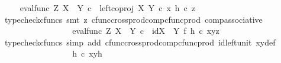\begin{isabellebody}
\ \isamarkupfalse%
\ {\isachardoublequoteopen}{\isachardot}{\kern0pt}{\isachardot}{\kern0pt}{\isachardot}{\kern0pt}\ {\isacharequal}{\kern0pt}\ eval{\isacharunderscore}{\kern0pt}func\ Z\ {\isacharparenleft}{\kern0pt}X\ {\isasymCoprod}\ Y{\isacharparenright}{\kern0pt}\ {\isasymcirc}\isactrlsub c\ \ {\isasymlangle}left{\isacharunderscore}{\kern0pt}coproj\ X\ Y\ {\isasymcirc}\isactrlsub c\ x{\isacharcomma}{\kern0pt}\ h\ {\isasymcirc}\isactrlsub c\ z{\isasymrangle}{\isachardoublequoteclose}\isanewline
\ \ \ \ \ \ \ \ \ \ \ \ \ \ \isamarkupfalse%
\ {\isacharparenleft}{\kern0pt}typecheck{\isacharunderscore}{\kern0pt}cfuncs{\isacharcomma}{\kern0pt}\ smt\ {\isacharparenleft}{\kern0pt}z{}{\isacharparenright}{\kern0pt}\ cfunc{\isacharunderscore}{\kern0pt}cross{\isacharunderscore}{\kern0pt}prod{\isacharunderscore}{\kern0pt}comp{\isacharunderscore}{\kern0pt}cfunc{\isacharunderscore}{\kern0pt}prod\ comp{\isacharunderscore}{\kern0pt}associative{}{\isacharparenright}{\kern0pt}\isanewline
\ \ \ \ \ \ \ \ \ \ \ \ \isamarkupfalse%
\ \isamarkupfalse%
\ {\isachardoublequoteopen}{\isachardot}{\kern0pt}{\isachardot}{\kern0pt}{\isachardot}{\kern0pt}\ {\isacharequal}{\kern0pt}\ eval{\isacharunderscore}{\kern0pt}func\ Z\ {\isacharparenleft}{\kern0pt}X\ {\isasymCoprod}\ Y{\isacharparenright}{\kern0pt}\ {\isasymcirc}\isactrlsub c\ \ {\isacharparenleft}{\kern0pt}{\isacharparenleft}{\kern0pt}id{\isacharparenleft}{\kern0pt}X\ {\isasymCoprod}\ Y{\isacharparenright}{\kern0pt}\ {\isasymtimes}\isactrlsub f\ h{\isacharparenright}{\kern0pt}\ {\isasymcirc}\isactrlsub c\ {\isasymlangle}xy{\isacharcomma}{\kern0pt}z{\isasymrangle}{\isacharparenright}{\kern0pt}{\isachardoublequoteclose}\isanewline
\ \ \ \ \ \ \ \ \ \ \ \ \ \ \isamarkupfalse%
\ {\isacharparenleft}{\kern0pt}typecheck{\isacharunderscore}{\kern0pt}cfuncs{\isacharcomma}{\kern0pt}\ simp\ add{\isacharcolon}{\kern0pt}\ cfunc{\isacharunderscore}{\kern0pt}cross{\isacharunderscore}{\kern0pt}prod{\isacharunderscore}{\kern0pt}comp{\isacharunderscore}{\kern0pt}cfunc{\isacharunderscore}{\kern0pt}prod\ id{\isacharunderscore}{\kern0pt}left{\isacharunderscore}{\kern0pt}unit{}\ xy{\isacharunderscore}{\kern0pt}def{\isacharparenright}{\kern0pt}\isanewline
\ \ \ \ \ \ \ \ \ \ \ \ \isamarkupfalse%
\ \isamarkupfalse%
\ {\isachardoublequoteopen}{\isachardot}{\kern0pt}{\isachardot}{\kern0pt}{\isachardot}{\kern0pt}\ {\isacharequal}{\kern0pt}\ h\isactrlsup {\isasymflat}\ {\isasymcirc}\isactrlsub c\ xyh{\isachardoublequoteclose}\isanewline

\end{isabellebody}
